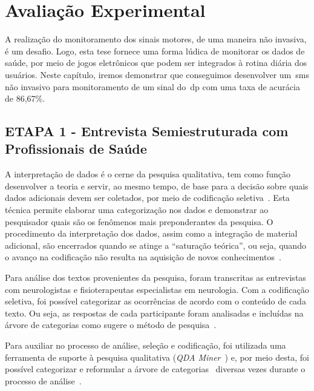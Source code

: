 \chapter{Avalia\c{c}\~{a}o Experimental} \label{chap:avaliacao}
A realização do monitoramento dos sinais motores, de uma maneira não invasiva, é um desafio. Logo, esta tese fornece uma forma lúdica de monitorar os dados de saúde, por meio de jogos eletrônicos que podem ser integrados à rotina diária dos usuários. Neste capítulo, iremos demonstrar que conseguimos desenvolver um~\ac{sms} não invasivo para monitoramento de um sinal do~\ac{dp} com uma taxa de acurácia de 86,67\%.




\section{ETAPA 1 - Entrevista Semiestruturada com Profissionais de Saúde}\label{sec:entrevista_semi_estruturada}



A interpretação de dados é o cerne da pesquisa qualitativa, tem como função desenvolver a teoria e servir, ao mesmo tempo, de base para a decisão sobre quais dados adicionais devem ser coletados, por meio de codificação seletiva~\cite{FLI04}. Esta técnica permite elaborar uma categorização nos dados e demonstrar ao pesquisador quais são os fenômenos mais preponderantes da pesquisa. O procedimento da interpretação dos dados, assim como a integração de material adicional, são encerrados quando se atinge a ``saturação teórica'', ou seja, quando o avanço na codificação não resulta na aquisição de novos conhecimentos~\cite{FLI04}.

Para análise dos textos provenientes da pesquisa, foram transcritas as entrevistas com neurologistas e fisioterapeutas especialistas em neurologia. Com  a codificação seletiva, foi possível categorizar as ocorrências de acordo com o conteúdo de cada texto. Ou seja, as respostas de cada participante foram analisadas e incluídas na árvore de categorias como sugere o método de pesquisa~\cite{FLI04}. 

Para auxiliar no processo de análise, seleção e codificação, foi utilizada uma ferramenta de suporte à pesquisa qualitativa (\textit{QDA Miner}~\cite{qda13}) e, por meio desta, foi possível categorizar e reformular a árvore de categorias~\cite{FLI04} diversas vezes durante o processo de análise~\cite{FLI04}.



